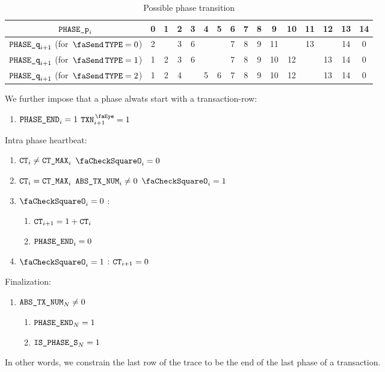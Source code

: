 \begin{table}[h]
    \centering
    \begin{tabular}{|c|c|c|c|c|c|c|c|c|c|c|c|c|c|c|c|} \hline
        $\texttt{PHASE\_p}_{i}$                         & 0 & 1 & 2 & 3 & 4 & 5 & 6 & 7 & 8 & 9  & 10 & 11 & 12 & 13 & 14 \\ \hline \hline
        $\texttt{PHASE\_q}_{i + 1}$ (for $\txType = 0$) & 2 &   & 3 & 6 &   &   & 7 & 8 & 9 & 11 &    & 13 &    & 14 & 0  \\ \hline
        $\texttt{PHASE\_q}_{i + 1}$ (for $\txType = 1$) & 1 & 2 & 3 & 6 &   &   & 7 & 8 & 9 & 10 & 12 &    & 13 & 14 & 0  \\ \hline
        $\texttt{PHASE\_q}_{i + 1}$ (for $\txType = 2$) & 1 & 2 & 4 &   & 5 & 6 & 7 & 8 & 9 & 10 & 12 &    & 13 & 14 & 0  \\ \hline
    \end{tabular}
    \caption{Possible phase transition}
    \label{tab:Possible phase transition}
\end{table}

We further impose that a phase alwats start with a transaction-row:
\begin{enumerate}[resume]
    \item $\texttt{PHASE\_END}_{i} = 1$ \Then $\isTxn_{i+1} = 1$
\end{enumerate}

Intra phase heartbeat:
\begin{enumerate}[resume]
    \item \If $\texttt{CT}_{i} \neq \texttt{CT\_MAX}_{i}$ \Then $\done_{i} = 0$
    \item \If $\texttt{CT}_{i} =    \texttt{CT\_MAX}_{i}$ \et $\texttt{ABS\_TX\_NUM}_{i} \neq 0$ \Then $\done_{i} = 1$
    \item \If $\done_{i} = 0$ \Then:
    \begin{enumerate}
        \item $\texttt{CT}_{i+1} = 1 + \texttt{CT}_{i}$ 
        \item $\texttt{PHASE\_END}_{i} = 0$
    \end{enumerate}
    \item \If $\done_{i} = 1$ \Then: $\texttt{CT}_{i+1} = 0$
\end{enumerate}

Finalization:
\begin{enumerate}[resume]
    \item \If $\texttt{ABS\_TX\_NUM}_{N} \neq 0$ \Then
    \begin{enumerate}
        \item $\texttt{PHASE\_END}_{N} = 1$
        \item $\texttt{IS\_PHASE\_S}_{N} = 1$ 
    \end{enumerate}
\end{enumerate}
In other words, we constrain the last row of the trace to be the end of the last phase of a transaction.